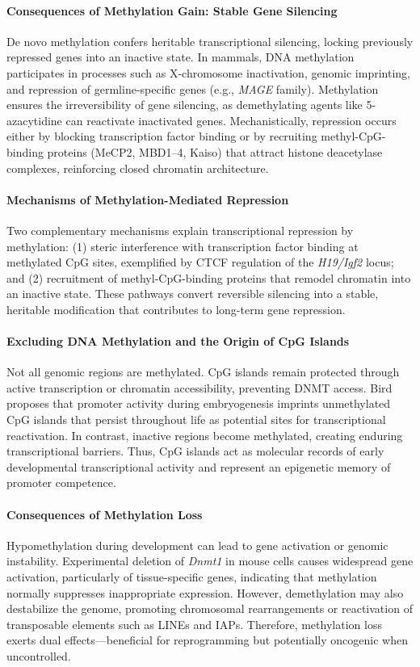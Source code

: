 \documentclass[10pt]{extarticle}
\begin{document}
\paragraph{Consequences of Methylation Gain: Stable Gene Silencing}
De novo methylation confers heritable transcriptional silencing, locking previously repressed genes into an inactive state. In mammals, DNA methylation participates in processes such as X-chromosome inactivation, genomic imprinting, and repression of germline-specific genes (e.g., \textit{MAGE} family). Methylation ensures the irreversibility of gene silencing, as demethylating agents like 5-azacytidine can reactivate inactivated genes. Mechanistically, repression occurs either by blocking transcription factor binding or by recruiting methyl-CpG-binding proteins (MeCP2, MBD1–4, Kaiso) that attract histone deacetylase complexes, reinforcing closed chromatin architecture.



\paragraph{Mechanisms of Methylation-Mediated Repression}
Two complementary mechanisms explain transcriptional repression by methylation: (1) steric interference with transcription factor binding at methylated CpG sites, exemplified by CTCF regulation of the \textit{H19/Igf2} locus; and (2) recruitment of methyl-CpG-binding proteins that remodel chromatin into an inactive state. These pathways convert reversible silencing into a stable, heritable modification that contributes to long-term gene repression.

\paragraph{Excluding DNA Methylation and the Origin of CpG Islands}
Not all genomic regions are methylated. CpG islands remain protected through active transcription or chromatin accessibility, preventing DNMT access. Bird proposes that promoter activity during embryogenesis imprints unmethylated CpG islands that persist throughout life as potential sites for transcriptional reactivation. In contrast, inactive regions become methylated, creating enduring transcriptional barriers. Thus, CpG islands act as molecular records of early developmental transcriptional activity and represent an epigenetic memory of promoter competence.

\paragraph{Consequences of Methylation Loss}
Hypomethylation during development can lead to gene activation or genomic instability. Experimental deletion of \textit{Dnmt1} in mouse cells causes widespread gene activation, particularly of tissue-specific genes, indicating that methylation normally suppresses inappropriate expression. However, demethylation may also destabilize the genome, promoting chromosomal rearrangements or reactivation of transposable elements such as LINEs and IAPs. Therefore, methylation loss exerts dual effects—beneficial for reprogramming but potentially oncogenic when uncontrolled.
\end{document}
